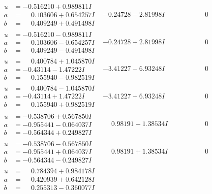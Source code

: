 \documentclass[1p]{elsarticle_modified}
\theoremstyle{definition}
\begin{document}
$$\begin{array}{c|c|c}
\begin{aligned}
u &= -0.516210 + 0.989811 I \\
a &= \phantom{-}0.103606 + 0.654257 I \\
b &= \phantom{-}0.409249 + 0.491498 I\end{aligned}
 & -0.24728 - 2.81998 I & \phantom{-0.000000 } 0 \\ \hline\begin{aligned}
u &= -0.516210 - 0.989811 I \\
a &= \phantom{-}0.103606 - 0.654257 I \\
b &= \phantom{-}0.409249 - 0.491498 I\end{aligned}
 & -0.24728 + 2.81998 I & \phantom{-0.000000 } 0 \\ \hline\begin{aligned}
u &= \phantom{-}0.400784 + 1.045870 I \\
a &= -0.43114 - 1.47222 I \\
b &= \phantom{-}0.155940 - 0.982519 I\end{aligned}
 & -3.41227 - 6.93248 I & \phantom{-0.000000 } 0 \\ \hline\begin{aligned}
u &= \phantom{-}0.400784 - 1.045870 I \\
a &= -0.43114 + 1.47222 I \\
b &= \phantom{-}0.155940 + 0.982519 I\end{aligned}
 & -3.41227 + 6.93248 I & \phantom{-0.000000 } 0 \\ \hline\begin{aligned}
u &= -0.538706 + 0.567850 I \\
a &= -0.955441 - 0.064037 I \\
b &= -0.564344 + 0.249827 I\end{aligned}
 & \phantom{-}0.98191 - 1.38534 I & \phantom{-0.000000 } 0 \\ \hline\begin{aligned}
u &= -0.538706 - 0.567850 I \\
a &= -0.955441 + 0.064037 I \\
b &= -0.564344 - 0.249827 I\end{aligned}
 & \phantom{-}0.98191 + 1.38534 I & \phantom{-0.000000 } 0 \\ \hline\begin{aligned}
u &= \phantom{-}0.784394 + 0.984178 I \\
a &= \phantom{-}0.420939 + 0.642128 I \\
b &= \phantom{-}0.255313 - 0.360077 I\end{aligned}

\end{array}$$
\end{document}
